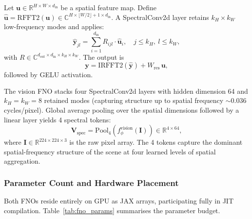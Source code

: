 \begin{definition}[SpectralConv2d]
Let $\mathbf{u} \in \mathbb{R}^{H \times W \times d_{\mathrm{in}}}$ be a spatial feature
map.
Define $\hat{\mathbf{u}} = \mathrm{RFFT2}(\mathbf{u}) \in
\mathbb{C}^{H \times \lfloor W/2 \rfloor + 1 \times d_{\mathrm{in}}}$.
A SpectralConv2d layer retains $k_{H} \times k_{W}$ low-frequency modes and applies:
\begin{equation}
\hat{\mathbf{y}}_{jl} = \sum_{i=1}^{d_{\mathrm{in}}} R_{ijl} \cdot \hat{\mathbf{u}}_i,
\quad j \leq k_H,\ l \leq k_W,
\label{eq:spectralconv2d}
\end{equation}
with $R \in \mathbb{C}^{d_{\mathrm{out}} \times d_{\mathrm{in}} \times k_H \times k_W}$.
The output is
\begin{equation}
\mathbf{y} = \mathrm{IRFFT2}(\hat{\mathbf{y}}) + W_{\mathrm{res}} \, \mathbf{u},
\label{eq:spectralconv2d_out}
\end{equation}
followed by GELU activation.
\end{definition}

The vision FNO stacks four SpectralConv2d layers with hidden dimension 64 and
$k_H = k_W = 8$ retained modes (capturing structure up to spatial frequency
$\sim 0.036$ cycles/pixel).
Global average pooling over the spatial dimensions followed by a linear layer yields
4 spectral tokens:
\begin{equation}
\mathbf{V}_{\mathrm{spec}} = \mathrm{Pool}_{4}\!\left(
    f_{\phi}^{\mathrm{vision}}\!\left(\mathbf{I}\right)
\right) \in \mathbb{R}^{4 \times 64},
\label{eq:vision_fno_out}
\end{equation}
where $\mathbf{I} \in \mathbb{R}^{224 \times 224 \times 3}$ is the raw pixel array.
The 4 tokens capture the dominant spatial-frequency structure of the scene at four
learned levels of spatial aggregation.

\subsubsection{Parameter Count and Hardware Placement}

Both FNOs reside entirely on GPU as JAX arrays, participating fully in JIT compilation.
Table~\ref{tab:fno_params} summarises the parameter budget.

